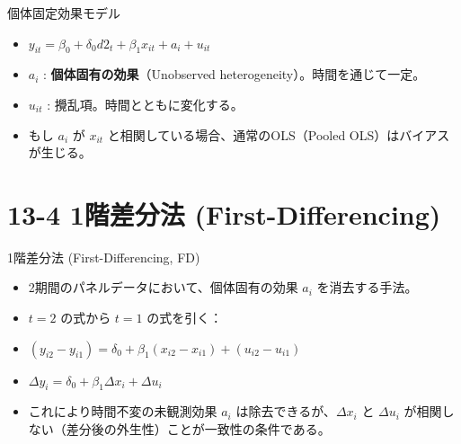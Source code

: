 \documentclass[
  ignorenonframetext,
]{beamer}
\providecommand{\tightlist}{%
  \setlength{\itemsep}{0pt}\setlength{\parskip}{0pt}}
\begin{document}
\begin{frame}{個体固定効果モデル}
\label{ux500bux4f53ux56faux5b9aux52b9ux679cux30e2ux30c7ux30eb}
\begin{itemize}
\tightlist
\item
  \(y_{it} = \beta_0 + \delta_0 d2_t + \beta_1 x_{it} + a_i + u_{it}\)
\item
  \(a_i\) : \textbf{個体固有の効果}（Unobserved
  heterogeneity）。時間を通じて一定。
\item
  \(u_{it}\) : 攪乱項。時間とともに変化する。
\item
  もし \(a_i\) が \(x_{it}\) と相関している場合、通常のOLS（Pooled
  OLS）はバイアスが生じる。
\end{itemize}
\end{frame}

\section{13-4 1階差分法
(First-Differencing)}\label{ux968eux5deeux5206ux6cd5-first-differencing}

\begin{frame}{1階差分法 (First-Differencing, FD)}
\label{ux968eux5deeux5206ux6cd5-first-differencing-fd}
\begin{itemize}
\tightlist
\item
  2期間のパネルデータにおいて、個体固有の効果 \(a_i\) を消去する手法。
\item
  \(t=2\) の式から \(t=1\) の式を引く：
\item
  \((y_{i2} - y_{i1}) = \delta_0 + \beta_1 (x_{i2} - x_{i1}) + (u_{i2} - u_{i1})\)
\item
  \(\Delta y_i = \delta_0 + \beta_1 \Delta x_i + \Delta u_i\)
\item
  これにより時間不変の未観測効果 \(a_i\) は除去できるが、\(\Delta x_i\)
  と \(\Delta u_i\)
  が相関しない（差分後の外生性）ことが一致性の条件である。
\end{itemize}
\end{frame}
\end{document}
